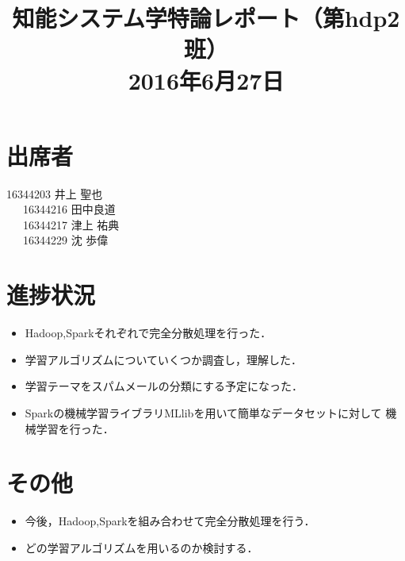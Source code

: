 \documentclass[a4paper,12pt]{jarticle}
\begin{document}
%
\title{\vspace{-30mm}知能システム学特論レポート（第hdp2班）\\ 2016年6月27日}
\date{}
%
%
\maketitle
%
\vspace{-30mm}
%
\section{出席者}
16344203 井上 聖也\\
~~~16344216 田中良道\\
~~~16344217 津上 祐典\\
~~~16344229 沈 歩偉
\section{進捗状況}
\begin{itemize}
 \item Hadoop,Sparkそれぞれで完全分散処理を行った．
 \item 学習アルゴリズムについていくつか調査し，理解した．
 \item 学習テーマをスパムメールの分類にする予定になった．
 \item Sparkの機械学習ライブラリMLlibを用いて簡単なデータセットに対して
	   機械学習を行った．
\end{itemize}

\section{その他}
\begin{itemize}
 \item 今後，Hadoop,Sparkを組み合わせて完全分散処理を行う．
 \item どの学習アルゴリズムを用いるのか検討する．
\end{itemize}
\end{document}

